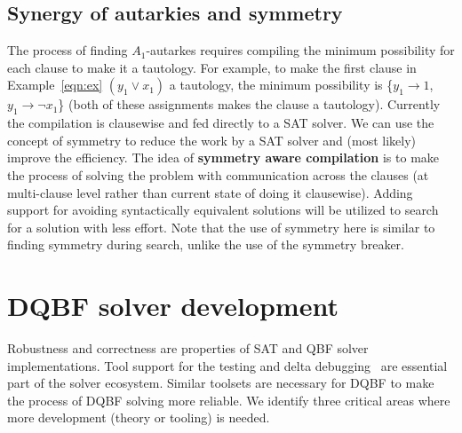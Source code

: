 \documentclass[conference]{IEEEtran}
\begin{document}

\subsection{Synergy of autarkies and symmetry}

The process of finding $A_{1}$-autarkes requires compiling the minimum possibility for each clause to make it a tautology.
%
For example, to make the first clause in Example~\ref{eqn:ex} $(y_1 \lor x_1)$ a tautology, the minimum possibility is \{$y_1 \to 1$, $y_1 \to \neg x_1$\} (both of these assignments makes the clause a tautology).
%
Currently the compilation is clausewise and fed directly to a SAT solver.
%
We can use the concept of symmetry to reduce the work by a SAT solver and (most likely) improve the efficiency.
%
The idea of \textbf{symmetry aware compilation} is to make the process of solving the problem with communication across the clauses (at multi-clause level rather than current state of doing it clausewise).
%
Adding support for avoiding syntactically equivalent solutions will be utilized to search for a solution with less effort.
%
Note that the use of symmetry here is similar to finding symmetry during search, unlike the use of the symmetry breaker. 
 

\section{DQBF solver development}
\label{sec:dev}

Robustness and correctness are properties of SAT and
QBF solver implementations.
%
Tool support for the testing and delta debugging~\cite{brummayer2010automated} are essential part of the solver ecosystem.
%
Similar toolsets are necessary for DQBF to make the process of DQBF solving more reliable.  
We identify three critical areas where more development (theory or tooling) is needed.
\end{document}
